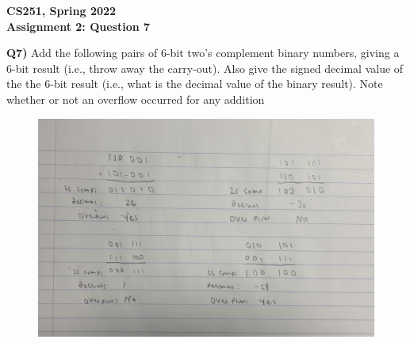 \documentclass[12pt]{article}
\begin{document}
\begin{center}
{\Large\textbf{CS251, Spring 2022}}\\
\vspace{2mm}
{\Large\textbf{Assignment 2: Question 7}}\\
\vspace{3mm}
\end{center}
\begin{adjustwidth}{0em}{0pt}
\textbf{Q7)} Add the following pairs of 6-bit two’s complement binary numbers, giving a 6-bit result (i.e., throw away the carry-out). Also give the signed decimal value of the the 6-bit result (i.e., what is the decimal value of the binary result). Note whether or not an overflow occurred for any addition\\
\begin{figure}[tbhp]
	\begin{center}
		\includegraphics[width=1\textwidth]{graph.jpg}
	\end{center}
\end{figure}

\end{adjustwidth}
\end{document}
